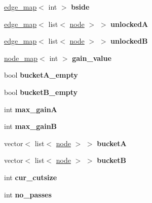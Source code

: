 \begin{DoxyCompactItemize}
\item 
\mbox{\label{classfm__partition_aa75765887173fb06b076b6cae12d4e66}} 
\mbox{\hyperlink{classedge__map}{edge\+\_\+map}}$<$ int $>$ {\bfseries bside}
\item 
\mbox{\label{classfm__partition_a7766d33d004b60c90a95220b2ada12e5}} 
\mbox{\hyperlink{classedge__map}{edge\+\_\+map}}$<$ list$<$ \mbox{\hyperlink{classnode}{node}} $>$ $>$ {\bfseries unlockedA}
\item 
\mbox{\label{classfm__partition_a8ac9c48ade76692d385dc61fa3ba5f68}} 
\mbox{\hyperlink{classedge__map}{edge\+\_\+map}}$<$ list$<$ \mbox{\hyperlink{classnode}{node}} $>$ $>$ {\bfseries unlockedB}
\item 
\mbox{\label{classfm__partition_ae8176f4ce82305abfd58e519d2cdd91d}} 
\mbox{\hyperlink{classnode__map}{node\+\_\+map}}$<$ int $>$ {\bfseries gain\+\_\+value}
\item 
\mbox{\label{classfm__partition_a4df2f0f6f4686ba187c2be39ce3b29cc}} 
bool {\bfseries bucket\+A\+\_\+empty}
\item 
\mbox{\label{classfm__partition_aef7d0f91cb7c04b4f5b1b14cc9884c37}} 
bool {\bfseries bucket\+B\+\_\+empty}
\item 
\mbox{\label{classfm__partition_a6c6a7a05bebe943e681329d30bb13339}} 
int {\bfseries max\+\_\+gainA}
\item 
\mbox{\label{classfm__partition_ac230f89828768eaf51374c0bc3b37558}} 
int {\bfseries max\+\_\+gainB}
\item 
\mbox{\label{classfm__partition_ad12e34fc6babe6b4796fb0e5811c844e}} 
vector$<$ list$<$ \mbox{\hyperlink{classnode}{node}} $>$ $>$ {\bfseries bucketA}
\item 
\mbox{\label{classfm__partition_a4c256551909261b6a5bcdaecd2637ba2}} 
vector$<$ list$<$ \mbox{\hyperlink{classnode}{node}} $>$ $>$ {\bfseries bucketB}
\item 
\mbox{\label{classfm__partition_abc8f24c354d2a15f8ec8ef9a46252c93}} 
int {\bfseries cur\+\_\+cutsize}
\item 
\mbox{\label{classfm__partition_af35277f499ad76a979ee33b0cd388dc5}} 
int {\bfseries no\+\_\+passes}
\end{DoxyCompactItemize}


